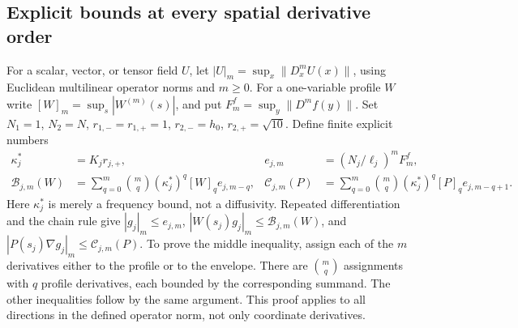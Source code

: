 \subsection{Explicit bounds at every spatial derivative order}

For a scalar, vector, or tensor field $U$, let
$|U|_m=\sup_x\|D_x^mU(x)\|$, using Euclidean multilinear
operator norms and $m\geq0$. For a one-variable profile $W$ write
$[W]_m=\sup_s|W^{(m)}(s)|$, and put $F_m^f=\sup_y\|D^mf(y)\|$.
Set $N_1=1$, $N_2=N$, $r_{1,-}=r_{1,+}=1$,
$r_{2,-}=h_0$, $r_{2,+}=\sqrt{10}$. Define finite explicit
numbers
\begin{align}
 \kappa_j^*&=K_jr_{j,+},&
 e_{j,m}&=(N_j/\ell_j)^m F_m^f,\nonumber\\
 \mathcal B_{j,m}(W)&=\sum_{q=0}^m\binom mq
       (\kappa_j^*)^q[W]_q e_{j,m-q},&
 \mathcal C_{j,m}(P)&=\sum_{q=0}^m\binom mq
       (\kappa_j^*)^q[P]_q e_{j,m-q+1}.
 \label{cvlane:ms:Bnorm}
\end{align}
Here $\kappa_j^*$ is merely a frequency bound, not a diffusivity.
Repeated differentiation and the chain rule give
$|g_j|_m\leq e_{j,m}$,
$|W(s_j)g_j|_m\leq\mathcal B_{j,m}(W)$, and
$|P(s_j)\nabla g_j|_m\leq\mathcal C_{j,m}(P)$.
To prove the middle inequality, assign each of the $m$ derivatives
either to the profile or to the envelope. There are $\binom mq$
assignments with $q$ profile derivatives, each bounded by the
corresponding summand. The other inequalities follow by the same
argument. This proof applies to all directions in the defined
operator norm, not only coordinate derivatives.

